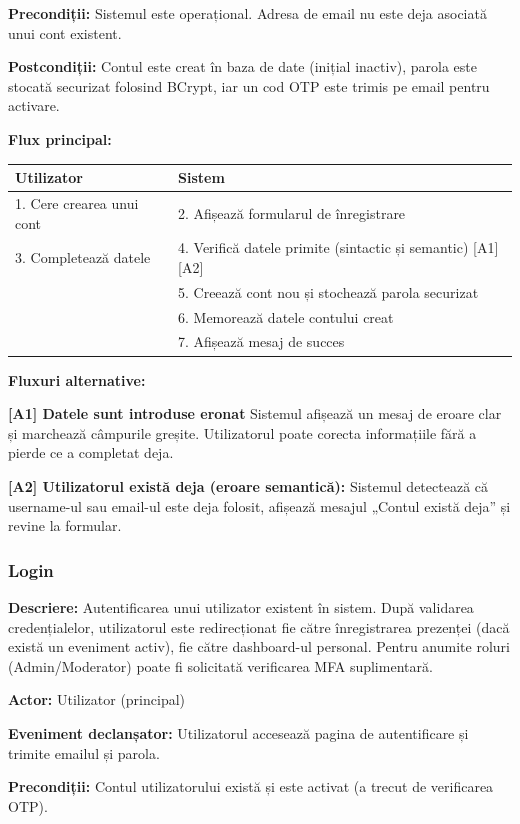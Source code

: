 \documentclass[11pt]{article}
\begin{document}
\textbf{Precondiții:} Sistemul este operațional. Adresa de email nu este deja asociată unui cont existent.

\textbf{Postcondiții:} Contul este creat în baza de date (inițial inactiv), parola este stocată securizat folosind BCrypt, iar un cod OTP este trimis pe email pentru activare.

\textbf{Flux principal:}

\begin{tabular}{l l}
\hline
\textbf{Utilizator} & \textbf{Sistem} \\
\hline
1. Cere crearea unui cont & 2. Afișează formularul de înregistrare \\
3. Completează datele & 4. Verifică datele primite (sintactic și semantic) [A1][A2] \\
 & 5. Creează cont nou și stochează parola securizat \\
 & 6. Memorează datele contului creat \\
 & 7. Afișează mesaj de succes \\
\hline
\end{tabular}

\textbf{Fluxuri alternative:}

\textbf{[A1] Datele sunt introduse eronat}  
Sistemul afișează un mesaj de eroare clar și marchează câmpurile greșite. Utilizatorul poate corecta informațiile fără a pierde ce a completat deja.


\textbf{[A2] Utilizatorul există deja (eroare semantică):}  
Sistemul detectează că username-ul sau email-ul este deja folosit, afișează mesajul „Contul există deja” și revine la formular.

\subsubsection{Login}


\textbf{Descriere:} Autentificarea unui utilizator existent în sistem. După validarea credențialelor, utilizatorul este redirecționat fie către înregistrarea prezenței (dacă există un eveniment activ), fie către dashboard-ul personal. Pentru anumite roluri (Admin/Moderator) poate fi solicitată verificarea MFA suplimentară.

\textbf{Actor:} Utilizator (principal)

\textbf{Eveniment declanșator:} Utilizatorul accesează pagina de autentificare și trimite emailul și parola.

\textbf{Precondiții:} Contul utilizatorului există și este activat (a trecut de verificarea OTP).
\end{document}
